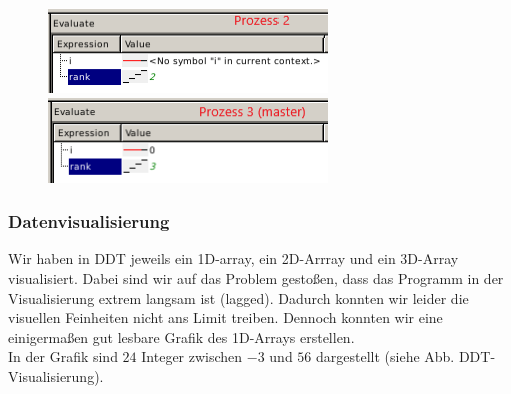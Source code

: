 \documentclass[12pt]{article}
\begin{document}
\begin{sloppypar}
\begin{figure}[htbp]
    \begin{minipage}[t]{\textwidth}
        \begin{minipage}[t]{0.5\textwidth}
            \includegraphics[width=\textwidth]{res/ddt-evaluate-2.PNG}
        \end{minipage}
        \begin{minipage}[t]{0.5\textwidth}
            \includegraphics[width=\textwidth]{res/ddt-evaluate-3.PNG}
        \end{minipage}
    \end{minipage}
\end{figure}


\subsubsection*{Datenvisualisierung}
Wir haben in DDT jeweils ein 1D-array, ein 2D-Arrray und ein 3D-Array visualisiert. Dabei sind wir auf das Problem gestoßen, dass das Programm in der Visualisierung extrem langsam ist (lagged). Dadurch konnten wir leider die visuellen Feinheiten nicht ans Limit treiben. Dennoch konnten wir eine einigermaßen gut lesbare Grafik des 1D-Arrays erstellen. \\

In der Grafik sind $24$ Integer zwischen $-3$ und $56$ dargestellt (siehe Abb. DDT-Visualisierung). \\


\end{sloppypar}
\end{document}
